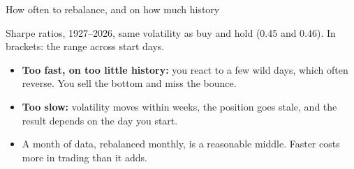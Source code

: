 \documentclass[aspectratio=169,10pt]{beamer}
\begin{document}
\begin{frame}{How often to rebalance, and on how much history}
\begin{center}
\renewcommand{\arraystretch}{1.12}
\end{center}
{\small Sharpe ratios, 1927--2026, same volatility as buy and hold (0.45 and 0.46). In brackets: the range across start days.}
\vskip 4pt
\begin{itemize}
\item \textbf{Too fast, on too little history:} you react to a few wild days, which often reverse. You sell the bottom and miss the bounce.
\item \textbf{Too slow:} volatility moves within weeks, the position goes stale, and the result depends on the day you start.
\item A month of data, rebalanced monthly, is a reasonable middle. Faster costs more in trading than it adds.
\end{itemize}
\end{frame}
\end{document}
